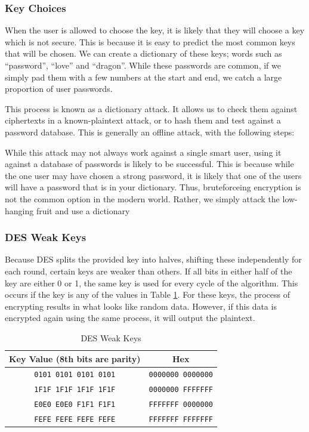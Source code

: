 			\subsubsection{Key Choices}
				When the user is allowed to choose the key, it is likely that they will choose a key which is not secure. 
				This is because it is easy to predict the most common keys that will be chosen.
				We can create a dictionary of these keys; words such as ``password'', ``love'' and ``dragon''. 
				While these passwords are common, if we simply pad them with a few numbers at the start and end, we catch a large proportion of user passwords. 

				This process is known as a dictionary attack. 
				It allows us to check them against ciphertexts in a known-plaintext attack, or to hash them and test against a password database. 
				This is generally an offline attack, with the following steps:
				
				While this attack may not always work against a single smart user, using it against a database of passwords is likely to be successful. 
				This is because while the one user may have chosen a strong password, it is likely that one of the users will have a password that is in your dictionary. 
				Thus, bruteforceing encryption is not the common option in the modern world. 
				Rather, we simply attack the low-hanging fruit and use a dictionary
			\subsubsection{DES Weak Keys}
				Because DES splits the provided key into halves, shifting these independently for each round, certain keys are weaker than others. 
				If all bits in either half of the key are either 0 or 1, the same key is used for every cycle of the algorithm. 
				This occurs if the key is any of the values in Table \ref{tab:DESWeakKeys}. 
				For these keys, the process of encrypting results in what looks like random data. 
				However, if this data is encrypted again using the same process, it will output the plaintext. 
				\begin{table}[htb]
					\centering
					\begin{tabular}{|c|c|}
						\hline
						\textbf{Key Value} (8th bits are parity) & \textbf{Hex} \\ \hline
						\texttt{0101 0101 0101 0101} & \texttt{0000000 0000000} \\ \hline
						\texttt{1F1F 1F1F 1F1F 1F1F} & \texttt{0000000 FFFFFFF} \\ \hline
						\texttt{E0E0 E0E0 F1F1 F1F1} & \texttt{FFFFFFF 0000000} \\ \hline
						\texttt{FEFE FEFE FEFE FEFE} & \texttt{FFFFFFF FFFFFFF} \\ \hline
					\end{tabular}
					\caption{DES Weak Keys}
					\label{tab:DESWeakKeys}
				\end{table}

